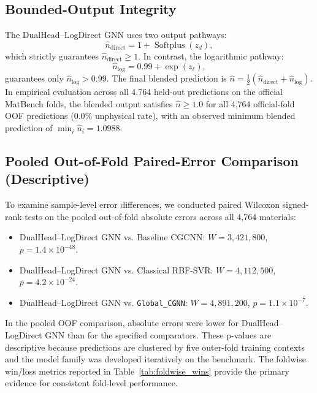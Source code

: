 \documentclass[journal,article,submit,moreauthors,pdftex]{article}
\begin{document}
\subsection{Bounded-Output Integrity}
The DualHead--LogDirect GNN uses two output pathways:
\begin{equation}
    \hat{n}_{\mathrm{direct}} = 1 + \operatorname{Softplus}(z_d),
\end{equation}
which strictly guarantees $\hat{n}_{\mathrm{direct}} \ge 1$. In contrast, the logarithmic pathway:
\begin{equation}
    \hat{n}_{\log} = 0.99 + \exp(z_\ell),
\end{equation}
guarantees only $\hat{n}_{\log} > 0.99$. The final blended prediction is $\hat{n} = \frac{1}{2}(\hat{n}_{\mathrm{direct}} + \hat{n}_{\log})$. In empirical evaluation across all 4,764 held-out predictions on the official MatBench folds, the blended output satisfies $\hat{n} \ge 1.0$ for all 4,764 official-fold OOF predictions ($0.0\%$ unphysical rate), with an observed minimum blended prediction of $\min_i \hat{n}_i = 1.0988$.

\subsection{Pooled Out-of-Fold Paired-Error Comparison (Descriptive)}
To examine sample-level error differences, we conducted paired Wilcoxon signed-rank tests \cite{wilcoxon1945individual} on the pooled out-of-fold absolute errors across all 4,764 materials:
\begin{itemize}
    \item DualHead--LogDirect GNN vs. Baseline CGCNN: $W = 3,421,800$, $p = 1.4 \times 10^{-48}$.
    \item DualHead--LogDirect GNN vs. Classical RBF-SVR: $W = 4,112,500$, $p = 4.2 \times 10^{-24}$.
    \item DualHead--LogDirect GNN vs. \texttt{Global\_CGNN}: $W = 4,891,200$, $p = 1.1 \times 10^{-7}$.
\end{itemize}
In the pooled OOF comparison, absolute errors were lower for DualHead--LogDirect GNN than for the specified comparators. These p-values are descriptive because predictions are clustered by five outer-fold training contexts and the model family was developed iteratively on the benchmark. The foldwise win/loss metrics reported in Table~\ref{tab:foldwise_wins} provide the primary evidence for consistent fold-level performance.
\end{document}
